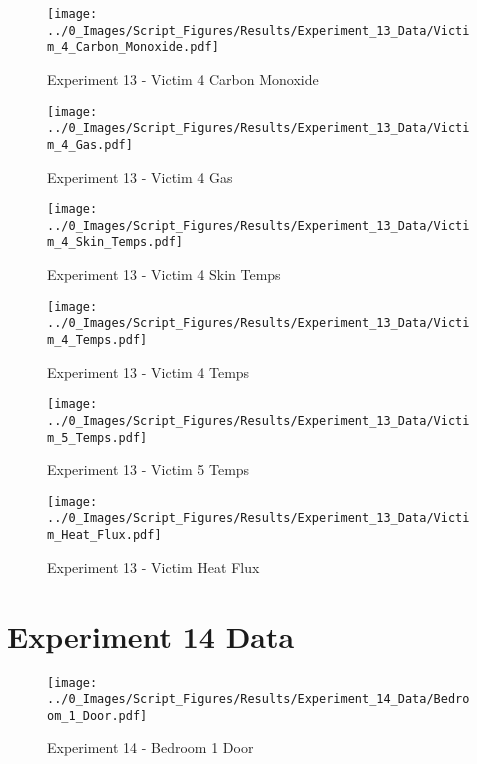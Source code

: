 	\clearpage

	\begin{figure}[H]
		\centering
		\texttt{[image: ../0\_Images/Script\_Figures/Results/Experiment\_13\_Data/Victim\_4\_Carbon\_Monoxide.pdf]}
		\caption[]{Experiment 13 - Victim 4 Carbon Monoxide}
	\end{figure}
 

	\begin{figure}[H]
		\centering
		\texttt{[image: ../0\_Images/Script\_Figures/Results/Experiment\_13\_Data/Victim\_4\_Gas.pdf]}
		\caption[]{Experiment 13 - Victim 4 Gas}
	\end{figure}
 
	\clearpage

	\begin{figure}[H]
		\centering
		\texttt{[image: ../0\_Images/Script\_Figures/Results/Experiment\_13\_Data/Victim\_4\_Skin\_Temps.pdf]}
		\caption[]{Experiment 13 - Victim 4 Skin Temps}
	\end{figure}
 

	\begin{figure}[H]
		\centering
		\texttt{[image: ../0\_Images/Script\_Figures/Results/Experiment\_13\_Data/Victim\_4\_Temps.pdf]}
		\caption[]{Experiment 13 - Victim 4 Temps}
	\end{figure}
 
	\clearpage

	\begin{figure}[H]
		\centering
		\texttt{[image: ../0\_Images/Script\_Figures/Results/Experiment\_13\_Data/Victim\_5\_Temps.pdf]}
		\caption[]{Experiment 13 - Victim 5 Temps}
	\end{figure}
 

	\begin{figure}[H]
		\centering
		\texttt{[image: ../0\_Images/Script\_Figures/Results/Experiment\_13\_Data/Victim\_Heat\_Flux.pdf]}
		\caption[]{Experiment 13 - Victim Heat Flux}
	\end{figure}
 
	\clearpage

\clearpage		\large
\section{Experiment 14 Data} \label{App:Exp14Results} 

	\begin{figure}[H]
		\centering
		\texttt{[image: ../0\_Images/Script\_Figures/Results/Experiment\_14\_Data/Bedroom\_1\_Door.pdf]}
		\caption[]{Experiment 14 - Bedroom 1 Door}
	\end{figure}
 


